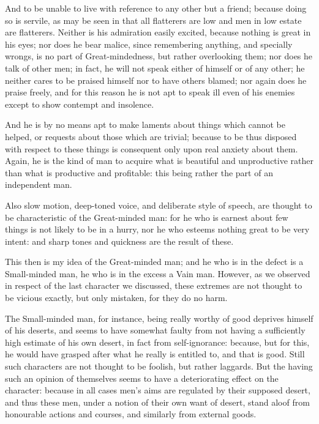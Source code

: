And to be unable to live with reference to any other but a friend; because
doing so is servile, as may be seen in that all flatterers are low and men in
low estate are flatterers. Neither is his admiration easily excited, because
nothing is great in his eyes; nor does he bear malice, since remembering
anything, and specially wrongs, is no part of Great-mindedness, but rather
overlooking them; nor does he talk of other men; in fact, he will not speak
either of himself or of any other; he neither cares to be praised himself nor
to have others blamed; nor again does he praise freely, and for this reason he
is not apt to speak ill even of his enemies except to show contempt and
insolence.

And he is by no means apt to make laments about things which cannot be helped,
or requests about those which are trivial; because to be thus disposed with
respect to these things is consequent only upon real anxiety about them. Again,
he is the kind of man to acquire what is beautiful and unproductive rather than
what is productive and profitable: this being rather the part of an independent
man.

Also slow motion, deep-toned voice, and deliberate style of speech, are thought
to be characteristic of the Great-minded man: for he who is earnest about few
things is not likely to be in a hurry, nor he who esteems nothing great to be
very intent: and sharp tones and quickness are the result of these.


This then is my idea of the Great-minded man; and he who is in the defect is a
Small-minded man, he who is in the excess a Vain man. However, as we observed
in respect of the last character we discussed, these extremes are not thought
to be vicious exactly, but only mistaken, for they do no harm.

The Small-minded man, for instance, being really worthy of good deprives
himself of his deserts, and seems to have somewhat faulty from not having a
sufficiently high estimate of his own desert, in fact from self-ignorance:
because, but for this, he would have grasped after what he really is entitled
to, and that is good. Still such characters are not thought to be foolish, but
rather laggards. But the having such an opinion of themselves seems to have a
deteriorating effect on the character: because in all cases men’s aims
are regulated by their supposed desert, and thus these men, under a notion of
their own want of desert, stand aloof from honourable actions and courses, and
similarly from external goods.

